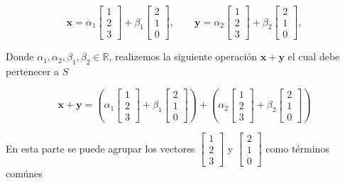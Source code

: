 \[
\mathbf{x} = {\alpha}_{1} 
\begin{bmatrix}
1 \\ 
2 \\ 
3
\end{bmatrix}
+
{\beta}_{1}
\begin{bmatrix}
2 \\ 
1 \\ 
0
\end{bmatrix},
\qquad
\mathbf{y} = {\alpha}_{2} 
\begin{bmatrix}
1 \\ 
2 \\ 
3
\end{bmatrix}
+
{\beta}_{2}
\begin{bmatrix}
2 \\ 
1 \\ 
0
\end{bmatrix},
\]

Donde ${\alpha}_{1},{\alpha}_{2},{\beta}_{1},{\beta}_{2} \in \mathbb{R}$, realizemos la siguiente operación $\mathbf{x}+\mathbf{y}$ el cual debe pertenecer a $S$

\[
\mathbf{x} + \mathbf{y} = \left( {\alpha}_{1} 
\begin{bmatrix}
1 \\ 
2 \\ 
3
\end{bmatrix}
+
{\beta}_{1}
\begin{bmatrix}
2 \\ 
1 \\ 
0
\end{bmatrix} \right)
+
\left( {\alpha}_{2} 
\begin{bmatrix}
1 \\ 
2 \\ 
3
\end{bmatrix}
+
{\beta}_{2}
\begin{bmatrix}
2 \\ 
1 \\ 
0
\end{bmatrix} \right)
\]

En esta parte se puede agrupar los vectores $\begin{bmatrix}
1 \\ 
2 \\ 
3
\end{bmatrix}$ y
$
\begin{bmatrix}
2 \\ 
1 \\ 
0
\end{bmatrix}$ como términos comúnes

